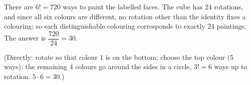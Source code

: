 There are $6!=720$ ways to paint the labelled faces. The cube has $24$ rotations, and since all six colours are different, no rotation other than the identity fixes a colouring; so each distinguishable colouring corresponds to exactly $24$ paintings. The answer is $\dfrac{720}{24}=\boxed{30}$.

(Directly: rotate so that colour $1$ is on the bottom; choose the top colour ($5$ ways); the remaining $4$ colours go around the sides in a circle, $3!=6$ ways up to rotation. $5\cdot6=30$.)
